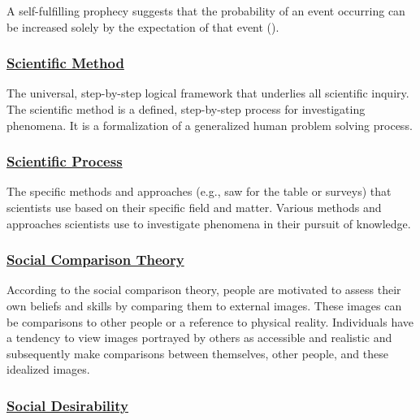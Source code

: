 \documentclass[
  letterpaper,
]{book}
\begin{document}
A self-fulfilling prophecy suggests that the probability of an event
occurring can be increased solely by the expectation of that event
().

\subsubsection*{\texorpdfstring{\hyperref[def-scientificmethod]{Scientific
Method}}{Scientific Method}}\label{scientific-method}

The universal, step-by-step logical framework that underlies all
scientific inquiry. The scientific method is a defined, step-by-step
process for investigating phenomena. It is a formalization of a
generalized human problem solving process.

\subsubsection*{\texorpdfstring{\hyperref[def-scientificprocess]{Scientific
Process}}{Scientific Process}}\label{scientific-process}

The specific methods and approaches (e.g., saw for the table or surveys)
that scientists use based on their specific field and matter. Various
methods and approaches scientists use to investigate phenomena in their
pursuit of knowledge.

\subsubsection*{\texorpdfstring{\hyperref[def-socialcomparisontheory]{Social
Comparison
Theory}}{Social Comparison Theory}}\label{social-comparison-theory}

According to the social comparison theory, people are motivated to
assess their own beliefs and skills by comparing them to external
images. These images can be comparisons to other people or a reference
to physical reality. Individuals have a tendency to view images
portrayed by others as accessible and realistic and subsequently make
comparisons between themselves, other people, and these idealized
images.

\subsubsection*{\texorpdfstring{\hyperref[def-socialdesirability]{Social
Desirability}}{Social Desirability}}\label{social-desirability}
\end{document}
